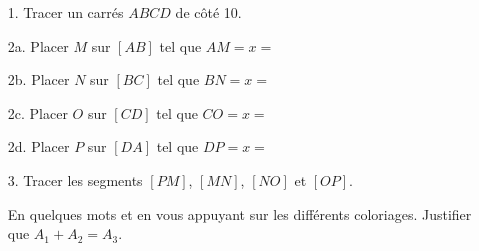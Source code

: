 \documentclass[12pt]{article}
\begin{document}
\begin{enumerate}
\item[1.] Tracer un carrés $ABCD$ de côté 10. 
\item[2a.] Placer $M$ sur $[AB]$ tel que $AM =  x = $
\item[2b.] Placer $N$ sur $[BC]$ tel que $BN =  x = $
\item[2c.] Placer $O$ sur $[CD]$ tel que $CO =  x = $
\item[2d.] Placer $P$ sur $[DA]$ tel que $DP =  x = $
\item[3.] Tracer les segments $[PM]$, $[MN]$, $[NO]$ et $[OP]$.
En quelques mots et en vous appuyant sur les différents coloriages. Justifier que $A_1 + A_2 = A_3$.

\end{enumerate}
\end{document}
